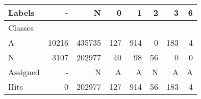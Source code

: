 \begin{tabular}{l|r|r|r|r|r|r|r}

Labels &      - &       N &    0 &    1 &   2 &    3 &  6 \\\hline
Classes  &        &         &      &      &     &      &    \\\hline
\hline
A        &  10216 &  435735 &  127 &  914 &   0 &  183 &  4 \\\hline
N        &   3107 &  202977 &   40 &   98 &  56 &    0 &  0 \\\hline
\hline
Assigned &      - &       N &    A &    A &   N &    A &  A \\\hline
Hits     &      0 &  202977 &  127 &  914 &  56 &  183 &  4 
\end{tabular}
